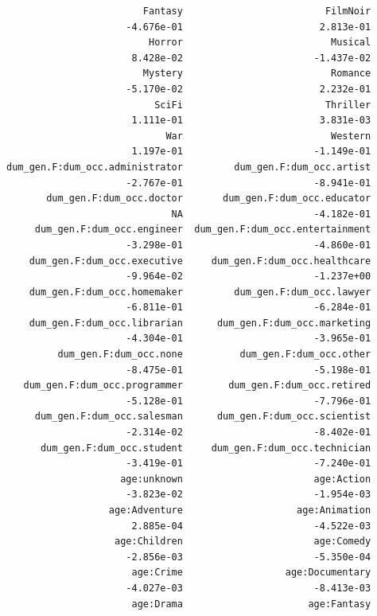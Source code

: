 \documentclass[11pt]{article}
\begin{document}
\begin{verbatim}
                        Fantasy                         FilmNoir  
                     -4.676e-01                        2.813e-01  
                         Horror                          Musical  
                      8.428e-02                       -1.437e-02  
                        Mystery                          Romance  
                     -5.170e-02                        2.232e-01  
                          SciFi                         Thriller  
                      1.111e-01                        3.831e-03  
                            War                          Western  
                      1.197e-01                       -1.149e-01  
dum_gen.F:dum_occ.administrator         dum_gen.F:dum_occ.artist  
                     -2.767e-01                       -8.941e-01  
       dum_gen.F:dum_occ.doctor       dum_gen.F:dum_occ.educator  
                             NA                       -4.182e-01  
     dum_gen.F:dum_occ.engineer  dum_gen.F:dum_occ.entertainment  
                     -3.298e-01                       -4.860e-01  
    dum_gen.F:dum_occ.executive     dum_gen.F:dum_occ.healthcare  
                     -9.964e-02                       -1.237e+00  
    dum_gen.F:dum_occ.homemaker         dum_gen.F:dum_occ.lawyer  
                     -6.811e-01                       -6.284e-01  
    dum_gen.F:dum_occ.librarian      dum_gen.F:dum_occ.marketing  
                     -4.304e-01                       -3.965e-01  
         dum_gen.F:dum_occ.none          dum_gen.F:dum_occ.other  
                     -8.475e-01                       -5.198e-01  
   dum_gen.F:dum_occ.programmer        dum_gen.F:dum_occ.retired  
                     -5.128e-01                       -7.796e-01  
     dum_gen.F:dum_occ.salesman      dum_gen.F:dum_occ.scientist  
                     -2.314e-02                       -8.402e-01  
      dum_gen.F:dum_occ.student     dum_gen.F:dum_occ.technician  
                     -3.419e-01                       -7.240e-01  
                    age:unknown                       age:Action  
                     -3.823e-02                       -1.954e-03  
                  age:Adventure                    age:Animation  
                      2.885e-04                       -4.522e-03  
                   age:Children                       age:Comedy  
                     -2.856e-03                       -5.350e-04  
                      age:Crime                  age:Documentary  
                     -4.027e-03                       -8.413e-03  
                      age:Drama                      age:Fantasy  

\end{verbatim}
\end{document}
